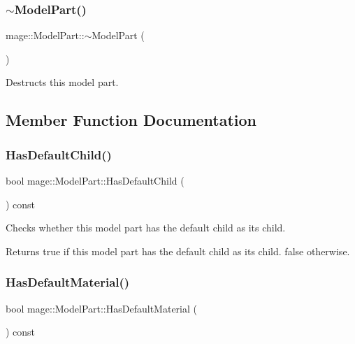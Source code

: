\subsubsection{\texorpdfstring{$\sim$\+Model\+Part()}{~ModelPart()}}
{\footnotesize\ttfamily mage\+::\+Model\+Part\+::$\sim$\+Model\+Part (\begin{DoxyParamCaption}{ }\end{DoxyParamCaption})\hspace{0.3cm}{\ttfamily [default]}}

Destructs this model part. 

\subsection{Member Function Documentation}
\hypertarget{structmage_1_1_model_part_aa12af4ef9373600229b7f46dacec0bca}{}\label{structmage_1_1_model_part_aa12af4ef9373600229b7f46dacec0bca} 
\subsubsection{\texorpdfstring{Has\+Default\+Child()}{HasDefaultChild()}}
{\footnotesize\ttfamily bool mage\+::\+Model\+Part\+::\+Has\+Default\+Child (\begin{DoxyParamCaption}{ }\end{DoxyParamCaption}) const\hspace{0.3cm}{\ttfamily [noexcept]}}

Checks whether this model part has the default child as its child.

\begin{DoxyReturn}{Returns}
{\ttfamily true} if this model part has the default child as its child. {\ttfamily false} otherwise. 
\end{DoxyReturn}
\hypertarget{structmage_1_1_model_part_a62e4f54f388430a17d27dc61a4436ed4}{}\label{structmage_1_1_model_part_a62e4f54f388430a17d27dc61a4436ed4} 
\subsubsection{\texorpdfstring{Has\+Default\+Material()}{HasDefaultMaterial()}}
{\footnotesize\ttfamily bool mage\+::\+Model\+Part\+::\+Has\+Default\+Material (\begin{DoxyParamCaption}{ }\end{DoxyParamCaption}) const\hspace{0.3cm}{\ttfamily [noexcept]}}

